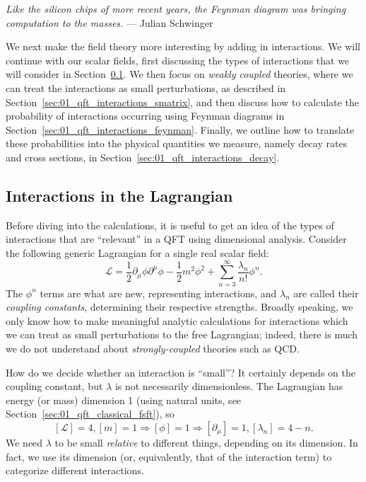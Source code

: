 \begin{center}
	\centering
	\noindent
	\textit{Like the silicon chips of more recent years, the Feynman diagram was bringing computation to the masses.} --- Julian Schwinger
\end{center}

We next make the field theory more interesting by adding in interactions.
We will continue with our scalar fields, first discussing the types of interactions that we will consider in Section~\ref{sec:01_qft_interactions_lagrangian}.
We then focus on \textit{weakly coupled} theories, where we can treat the interactions as small perturbations, as described in Section~\ref{sec:01_qft_interactions_smatrix}, and then discuss how to calculate the probability of interactions occurring using Feynman diagrams in Section~\ref{sec:01_qft_interactions_feynman}.
Finally, we outline how to translate these probabilities into the physical quantities we measure, namely decay rates and cross sections, in Section~\ref{sec:01_qft_interactions_decay}.

\subsection{Interactions in the Lagrangian}
\label{sec:01_qft_interactions_lagrangian}

Before diving into the calculations, it is useful to get an idea of the types of interactions that are ``relevant'' in a QFT using dimensional analysis.
Consider the following generic Lagrangian for a single real scalar field:
\begin{equation}
    \label{eq:01_qft_interactions_lagrangian}
    \mathcal L = \frac{1}{2}\partial_\mu\phi\partial^\mu\phi - \frac{1}{2}m^2\phi^2 + \sum_{n=3}^\infty \frac{\lambda_n}{n!}\phi^n.
\end{equation}
The $\phi^n$ terms are what are new, representing interactions, and $\lambda_n$ are called their \textit{coupling constants}, determining their respective strengths.
Broadly speaking, we only know how to make meaningful analytic calculations for interactions which we can treat as small perturbations to the free Lagrangian; indeed, there is much we do not understand about \textit{strongly-coupled} theories such as QCD.

How do we decide whether an interaction is ``small''?
It certainly depends on the coupling constant, but $\lambda$ is not necessarily dimensionless.
The Lagrangian has energy (or mass) dimension 1 (using natural units, see Section~\ref{sec:01_qft_classical_fsft}), so
\begin{equation}
    \label{eq:01_qft_interactions_lagrangian_dimension}
    [\mathcal L] = 4, [m] = 1 \Rightarrow [\phi] = 1 \Rightarrow [\partial_\mu] = 1, [\lambda_n] = 4 - n.
\end{equation}
We need $\lambda$ to be small \textit{relative} to different things, depending on its dimension.
In fact, we use its dimension (or, equivalently, that of the interaction term) to categorize different interactions.


